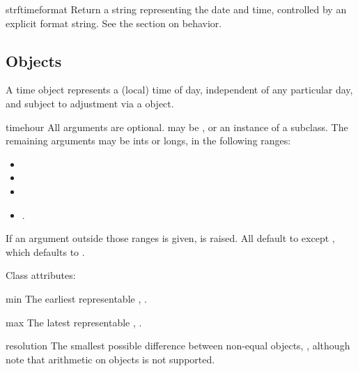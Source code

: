 \begin{methoddesc}{strftime}{format}
  Return a string representing the date and time, controlled by an
  explicit format string.  See the section on 
  behavior.
\end{methoddesc}


\subsection{ Objects \label{datetime-time}}

A time object represents a (local) time of day, independent of any
particular day, and subject to adjustment via a  object.

\begin{classdesc}{time}{hour}
  All arguments are optional.   may be , or
  an instance of a  subclass.  The remaining arguments
  may be ints or longs, in the following ranges:

  \begin{itemize}
    \item {}
    \item {}
    \item {}
    \item {}.
  \end{itemize}

  If an argument outside those ranges is given,
   is raised.  All default to  except
  , which defaults to .
\end{classdesc}

Class attributes:

\begin{memberdesc}{min}
  The earliest representable , .
\end{memberdesc}

\begin{memberdesc}{max}
  The latest representable , .
\end{memberdesc}

\begin{memberdesc}{resolution}
  The smallest possible difference between non-equal 
  objects, , although note that
  arithmetic on  objects is not supported.
\end{memberdesc}

